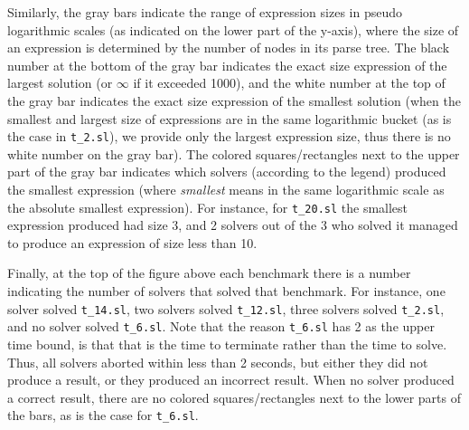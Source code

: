 Similarly, the gray bars indicate the range of expression sizes in pseudo logarithmic scales (as indicated on the lower part of the y-axis), where the size of an expression is determined by the number of nodes in its parse tree.
The black number at the bottom of the gray bar indicates the exact size expression of the largest solution (or $\infty$ if it exceeded 1000), and the white number at the top of the gray bar indicates the exact size expression of the smallest solution (when the smallest and largest size of expressions are in the same logarithmic bucket (as is the case in \texttt{t\_2.sl}), we provide only the largest expression size, thus there is no white number on the gray bar). The colored squares/rectangles next to the upper part of the gray bar indicates which solvers (according to the legend) produced the smallest expression (where \emph{smallest} means in the same logarithmic scale as the absolute smallest expression). For instance, for \texttt{t\_20.sl} the smallest expression produced had size 3, and 2 solvers out of the 3 who solved it managed to produce an expression of size less than 10.  

Finally, at the top of the figure above each benchmark there is a number indicating the number of solvers that solved that benchmark. For instance, one solver solved \texttt{t\_14.sl}, two solvers solved \texttt{t\_12.sl}, three solvers solved \texttt{t\_2.sl}, and no solver solved \texttt{t\_6.sl}. Note that the reason \texttt{t\_6.sl} has 2 as the upper time bound, is that that is the time to terminate rather than the time to solve. Thus, all solvers aborted within less than 2 seconds, but either they did not produce a result, or they produced an incorrect result. When no solver produced a correct result, there are no colored squares/rectangles next to the lower parts of the bars, as is the case for \texttt{t\_6.sl}.


